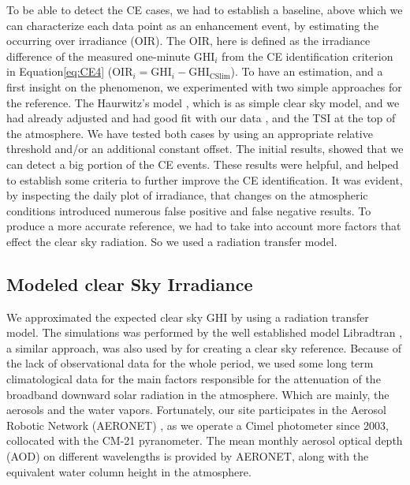 \documentclass[preprint, 3p,
authoryear]{elsarticle} %
\begin{document}
To be able to detect the CE cases, we had to establish a baseline, above
which we can characterize each data point as an enhancement event, by
estimating the occurring over irradiance (OIR). The OIR, here is defined
as the irradiance difference of the measured one-minute \(\text{GHI}_i\)
from the CE identification criterion in
Equation\nobreakspace\ref{eq:CE4}
(\(\text{OIR}_i = \text{GHI}_i - \text{GHI}_\text{CSlim}\)). To have an
estimation, and a first insight on the phenomenon, we experimented with
two simple approaches for the reference. The Haurwitz's model
\citep{Haurwitz1945}, which is as simple clear sky model, and we had
already adjusted and had good fit with our data \citep{Natsis2023}, and
the TSI at the top of the atmosphere. We have tested both cases by using
an appropriate relative threshold and/or an additional constant offset.
The initial results, showed that we can detect a big portion of the CE
events. These results were helpful, and helped to establish some
criteria to further improve the CE identification. It was evident, by
inspecting the daily plot of irradiance, that changes on the atmospheric
conditions introduced numerous false positive and false negative
results. To produce a more accurate reference, we had to take into
account more factors that effect the clear sky radiation. So we used a
radiation transfer model.

\hypertarget{modeled-clear-sky-irradiance}{%
\subsection{Modeled clear Sky
Irradiance}\label{modeled-clear-sky-irradiance}}

We approximated the expected clear sky GHI by using a radiation transfer
model. The simulations was performed by the well established model
Libradtran \citep{Emde2016}, a similar approach, was also used by
\citet{Vamvakas2020} for creating a clear sky reference. Because of the
lack of observational data for the whole period, we used some long term
climatological data for the main factors responsible for the attenuation
of the broadband downward solar radiation in the atmosphere. Which are
mainly, the aerosols and the water vapors. Fortunately, our site
participates in the Aerosol Robotic Network (AERONET)
\citep{Giles2019, Buis1998}, as we operate a Cimel photometer since
2003, collocated with the CM-21 pyranometer. The mean monthly aerosol
optical depth (AOD) on different wavelengths is provided by AERONET,
along with the equivalent water column height in the atmosphere.
\end{document}
